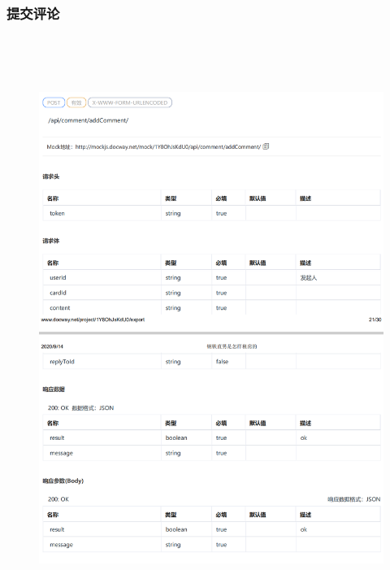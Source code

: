         \subsubsection{提交评论}
        \begin{figure}[h]
            \centering
            \includegraphics[height=19.0cm,width=14.0cm]{design/image/api23.png} 
            \end{figure}  
            \newpage 
            
